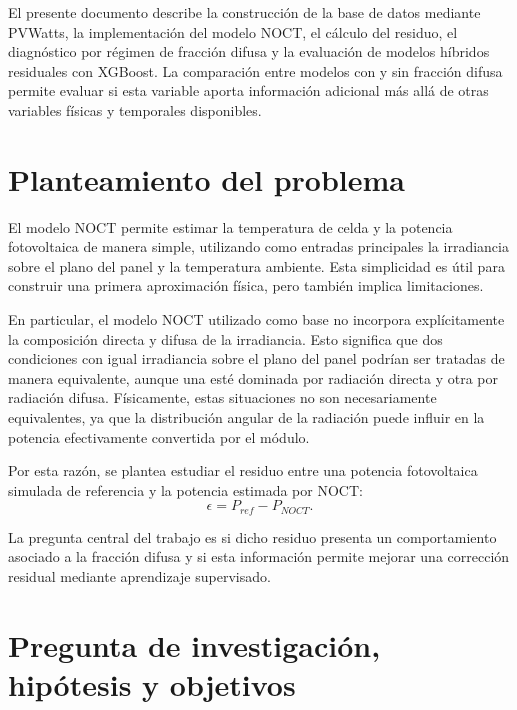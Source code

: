 \documentclass[12pt, letterpaper]{article}
\begin{document}
El presente documento describe la construcci\'on de la base de datos mediante PVWatts, la implementaci\'on del modelo NOCT, el c\'alculo del residuo, el diagn\'ostico por r\'egimen de fracci\'on difusa y la evaluaci\'on de modelos h\'ibridos residuales con XGBoost. La comparaci\'on entre modelos con y sin fracci\'on difusa permite evaluar si esta variable aporta informaci\'on adicional m\'as all\'a de otras variables f\'isicas y temporales disponibles.


\section{Planteamiento del problema}

El modelo NOCT permite estimar la temperatura de celda y la potencia fotovoltaica de manera simple, utilizando como entradas principales la irradiancia sobre el plano del panel y la temperatura ambiente. Esta simplicidad es \'util para construir una primera aproximaci\'on f\'isica, pero tambi\'en implica limitaciones.

En particular, el modelo NOCT utilizado como base no incorpora expl\'icitamente la composici\'on directa y difusa de la irradiancia. Esto significa que dos condiciones con igual irradiancia sobre el plano del panel podr\'ian ser tratadas de manera equivalente, aunque una est\'e dominada por radiaci\'on directa y otra por radiaci\'on difusa. F\'isicamente, estas situaciones no son necesariamente equivalentes, ya que la distribuci\'on angular de la radiaci\'on puede influir en la potencia efectivamente convertida por el m\'odulo.

Por esta raz\'on, se plantea estudiar el residuo entre una potencia fotovoltaica simulada de referencia y la potencia estimada por NOCT:
\[
    \epsilon = P_{ref} - P_{NOCT}.
\]

La pregunta central del trabajo es si dicho residuo presenta un comportamiento asociado a la fracci\'on difusa y si esta informaci\'on permite mejorar una correcci\'on residual mediante aprendizaje supervisado.


\section{Pregunta de investigaci\'on, hip\'otesis y objetivos}
\end{document}
